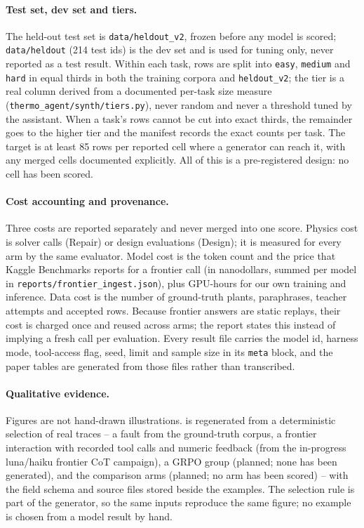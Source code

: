 \paragraph{Test set, dev set and tiers.}
The held-out test set is \texttt{data/heldout\_v2}, frozen before any model is scored; \texttt{data/heldout} (214 test ids) is the dev set and is used for tuning only, never reported as a test result. Within each task, rows are split into \texttt{easy}, \texttt{medium} and \texttt{hard} in equal thirds in both the training corpora and \texttt{heldout\_v2}; the tier is a real column derived from a documented per-task size measure (\texttt{thermo\_agent/synth/tiers.py}), never random and never a threshold tuned by the assistant. When a task's rows cannot be cut into exact thirds, the remainder goes to the higher tier and the manifest records the exact counts per task. The target is at least 85 rows per reported cell where a generator can reach it, with any merged cells documented explicitly. All of this is a pre-registered design: no cell has been scored.

\paragraph{Cost accounting and provenance.}
Three costs are reported separately and never merged into one score. Physics cost is solver calls (Repair) or design evaluations (Design); it is measured for every arm by the same evaluator. Model cost is the token count and the price that Kaggle Benchmarks reports for a frontier call (in nanodollars, summed per model in \texttt{reports/frontier\_ingest.json}), plus GPU-hours for our own training and inference. Data cost is the number of ground-truth plants, paraphrases, teacher attempts and accepted rows. Because frontier answers are static replays, their cost is charged once and reused across arms; the report states this instead of implying a fresh call per evaluation. Every result file carries the model id, harness mode, tool-access flag, seed, limit and sample size in its \texttt{meta} block, and the paper tables are generated from those files rather than transcribed.

\paragraph{Qualitative evidence.}
Figures are not hand-drawn illustrations.  is regenerated from a deterministic selection of real traces -- a fault from the ground-truth corpus, a frontier interaction with recorded tool calls and numeric feedback (from the in-progress luna/haiku frontier CoT campaign), a GRPO group (planned; none has been generated), and the comparison arms (planned; no arm has been scored) -- with the field schema and source files stored beside the examples. The selection rule is part of the generator, so the same inputs reproduce the same figure; no example is chosen from a model result by hand.

